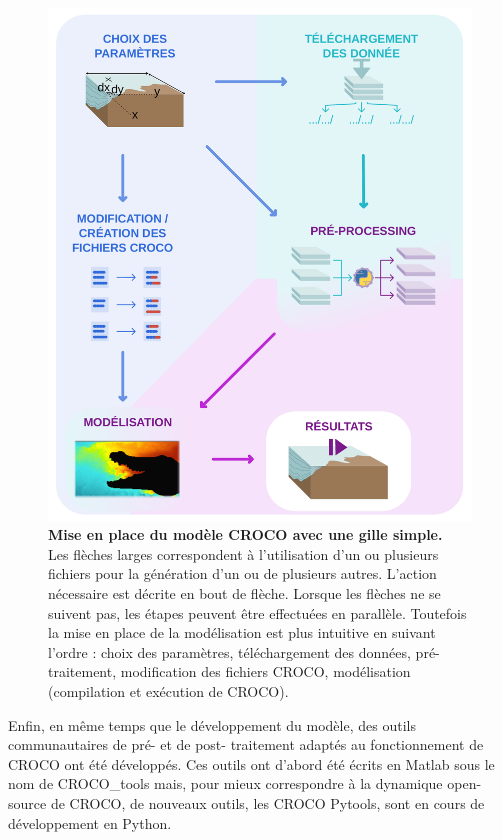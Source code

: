 \documentclass[10pt,a4paper,titlepage]{article}
\begin{document}
\begin{figure}[h!]
    \centering
    \includegraphics[scale=0.35]{../images/workflow/mise_en_place_generale_croco.pdf}
    \caption{
        \textbf{Mise en place du modèle CROCO avec une gille simple.}
        \\Les flèches larges correspondent à l'utilisation d'un ou plusieurs fichiers pour la génération d'un ou de plusieurs autres.
        L'action nécessaire est décrite en bout de flèche.
        Lorsque les flèches ne se suivent pas, les étapes peuvent être effectuées en parallèle.
        Toutefois la mise en place de la modélisation est plus intuitive en suivant l'ordre : {\color{paramColor}choix des paramètres}, {\color{dataColor} téléchargement des données}, {\color{workColor} pré-traitement}, {\color{paramColor} modification des fichiers CROCO}, {\color{workColor} modélisation (compilation et exécution de CROCO)}.
    }
    \label{fig:workflow_simple}
\end{figure}

Enfin, en même temps que le développement du modèle, des outils communautaires de pré- et de post- traitement adaptés au fonctionnement de CROCO ont été développés.
Ces outils ont d'abord été écrits en Matlab sous le nom de CROCO\_tools mais, pour mieux correspondre à la dynamique open-source de CROCO, de nouveaux outils, les CROCO Pytools, sont en cours de développement en Python.
\end{document}
